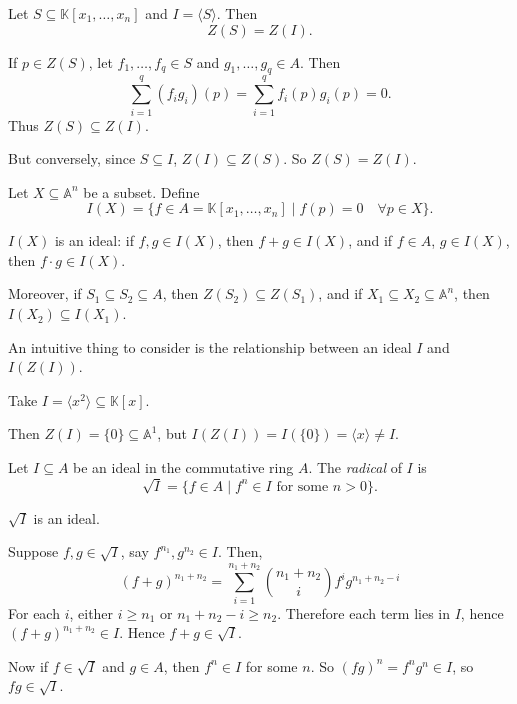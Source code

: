 \documentclass[12pt]{article}
\begin{document}
\begin{lemma}
	Let $S \subseteq \mathbb{K}[x_1, \ldots, x_n]$ and $I = \langle S \rangle$. Then
	\[
	Z(S) = Z(I).
	\]
\end{lemma}

\begin{proofbox}
	If $p \in Z(S)$, let $f_1, \ldots, f_q \in S$ and $g_1, \ldots, g_q \in A$. Then
	\[
	\sum_{i = 1}^q (f_i g_i)(p) = \sum_{i = 1}^q f_i(p) g_i(p) = 0.
	\]
	Thus $Z(S) \subseteq Z(I)$.

	But conversely, since $S \subseteq I$, $Z(I) \subseteq Z(S)$. So $Z(S) = Z(I)$.
\end{proofbox}


\begin{definition}
	Let $X \subseteq \mathbb{A}^n$ be a subset. Define
	\[
		I(X) = \{f \in A = \mathbb{K}[x_1, \ldots, x_n] \mid f(p) = 0 \quad \forall p \in X\}.
	\]
\end{definition}

\begin{remark}
	$I(X)$ is an ideal: if $f, g \in I(X)$, then $f + g \in I(X)$, and if $f \in A$, $g \in I(X)$, then $f \cdot g \in I(X)$.

	Moreover, if $S_1 \subseteq S_2 \subseteq A$, then $Z(S_2) \subseteq Z(S_1)$, and if $X_1 \subseteq X_2 \subseteq \mathbb{A}^n$, then $I(X_2) \subseteq I(X_1)$.
\end{remark}

An intuitive thing to consider is the relationship between an ideal $I$ and $I(Z(I))$.

\begin{exbox}
	Take $I = \langle x^2 \rangle \subseteq \mathbb{K}[x]$.

	Then $Z(I) = \{0\} \subseteq \mathbb{A}^1$, but $I(Z(I)) = I(\{0\}) = \langle x \rangle \neq I$.
\end{exbox}

\begin{definition}
	Let $I \subseteq A$ be an ideal in the commutative ring $A$. The \emph{radical} of $I$ is
	\[
		\sqrt I = \{f \in A \mid f^n \in I \text{ for some } n > 0\}.
	\]
\end{definition}

\begin{lemma}
	$\sqrt I$ is an ideal.
\end{lemma}

\begin{proofbox}
	Suppose $f, g \in \sqrt I$, say $f^{n_1}, g^{n_2} \in I$. Then,
	\[
		(f + g)^{n_1 + n_2} = \sum_{i = 1}^{n_1 + n_2} \binom{n_1 + n_2}{i} f^{i} g^{n_1 + n_2 - i}
	\]
	For each $i$, either $i \geq n_1$ or $n_1 + n_2 - i \geq n_2$. Therefore each term lies in $I$, hence $(f + g)^{n_1 + n_2} \in I$. Hence $f + g \in \sqrt I$.

	Now if $f \in \sqrt I$ and $g \in A$, then $f^n \in I$ for some $n$. So $(fg)^n = f^n g^n \in I$, so $fg \in \sqrt I$.
\end{proofbox}
\end{document}
